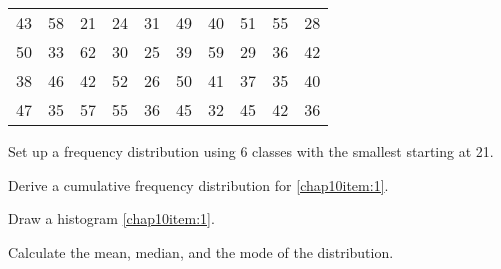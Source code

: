 \begin{myenumerate}
\begin{center}
\begin{tabular}{cccccccccc}
43 & 58 & 21 & 24 & 31 & 49 & 40 & 51 & 55 & 28\\
50 & 33 & 62 & 30 & 25 & 39 & 59 & 29 & 36 & 42\\
38 & 46 & 42 & 52 & 26 & 50 & 41 & 37 & 35 & 40\\
47 & 35 & 57 & 55 & 36 & 45 & 32 & 45 & 42 & 36\\
\end{tabular}
\end{center}
   \begin{myenumerate}
	\item\label{chap10item:1} Set up a frequency distribution using 6 classes with the smallest starting at 21.
	\item Derive a cumulative frequency distribution for \eqref{chap10item:1}.
	\item Draw a histogram \eqref{chap10item:1}.
	\item Calculate the mean, median, and the mode of the distribution.
	\end{myenumerate}
\end{myenumerate}
